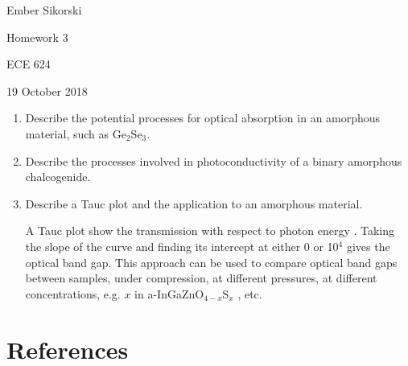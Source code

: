 \documentclass[12pt]{elsarticle}
\newcommand{\vs}{\vspace{2mm}}
\begin{document}
\begin{flushright}
	Ember Sikorski\par
	Homework 3\par
	ECE 624\par 
	19 October 2018
\end{flushright}


\begin{enumerate}
\item Describe the potential processes for optical absorption in an amorphous material, such as Ge$_{2}$Se$_{3}$. \par \vs


\item Describe the processes involved in photoconductivity of a binary amorphous chalcogenide.


\item Describe a Tauc plot and the application to an amorphous material. \par \vs
A Tauc plot show the transmission with respect to photon energy \cite{Zallen1983,Kim2015}. Taking the slope of the curve and finding its intercept at either 0 or 10$^{4}$ gives the optical band gap. This approach can be used to compare optical band gaps between samples, under compression, at different pressures, at different concentrations, e.g. $x$ in a-InGaZnO$_{4-x}$S$_{x}$ \cite{Kim2015}, etc.

\end{enumerate}


\section*{References}


\end{document}

